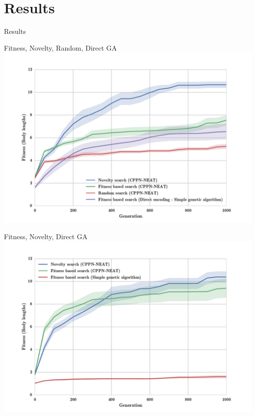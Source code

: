 \documentclass{beamer}
\begin{document}
\section{Results}

\begin{frame}[allowframebreaks]{Results}

\begin{minipage}{\textwidth}
\begin{block}{Fitness, Novelty, Random, Direct GA}
\includegraphics[width=1.0\textwidth]{figures/results/FitNovRandomDirectSize5.pdf}
\end{block}
\end{minipage}

\begin{minipage}{\textwidth}
\begin{block}{Fitness, Novelty, Direct GA}
\includegraphics[width=1.0\textwidth]{figures/results/FitvsNovVsDirSize10.pdf}
\end{block}
\end{minipage}


\end{frame}
\end{document}

